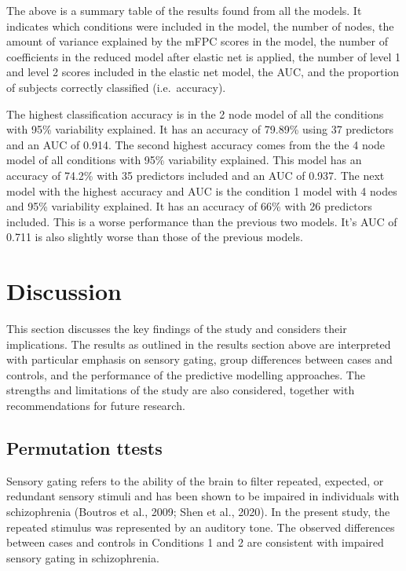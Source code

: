 \documentclass{article}
\begin{document}
The above is a summary table of the results found from all the models.
It indicates which conditions were included in the model, the number of
nodes, the amount of variance explained by the mFPC scores in the model,
the number of coefficients in the reduced model after elastic net is
applied, the number of level 1 and level 2 scores included in the
elastic net model, the AUC, and the proportion of subjects correctly
classified (i.e.~accuracy).

The highest classification accuracy is in the 2 node model of all the
conditions with 95\% variability explained. It has an accuracy of
79.89\% using 37 predictors and an AUC of 0.914. The second highest
accuracy comes from the the 4 node model of all conditions with 95\%
variability explained. This model has an accuracy of 74.2\% with 35
predictors included and an AUC of 0.937. The next model with the highest
accuracy and AUC is the condition 1 model with 4 nodes and 95\%
variability explained. It has an accuracy of 66\% with 26 predictors
included. This is a worse performance than the previous two models. It's
AUC of 0.711 is also slightly worse than those of the previous models.

\section{Discussion}\label{discussion}

\label{sec:discussion}

This section discusses the key findings of the study and considers their
implications. The results as outlined in the results section above are
interpreted with particular emphasis on sensory gating, group
differences between cases and controls, and the performance of the
predictive modelling approaches. The strengths and limitations of the
study are also considered, together with recommendations for future
research.

\subsection{Permutation ttests}\label{permutation-ttests}

Sensory gating refers to the ability of the brain to filter repeated,
expected, or redundant sensory stimuli and has been shown to be impaired
in individuals with schizophrenia (Boutros et al., 2009; Shen et al.,
2020). In the present study, the repeated stimulus was represented by an
auditory tone. The observed differences between cases and controls in
Conditions 1 and 2 are consistent with impaired sensory gating in
schizophrenia.
\end{document}
